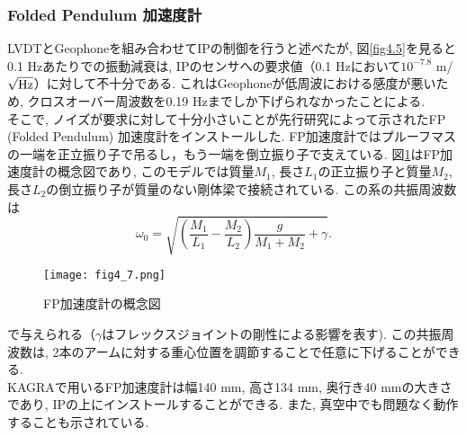 \subsubsection{Folded Pendulum 加速度計}
\vskip3mm
LVDTとGeophoneを組み合わせてIPの制御を行うと述べたが, 図\ref{fig4.5}を見ると0.1 Hzあたりでの振動減衰は, IPのセンサへの要求値（0.1 Hzにおいて$10^{-7.8}$ m/$\sqrt{{\rm Hz}}$）に対して不十分である. これはGeophoneが低周波における感度が悪いため, クロスオーバー周波数を0.19 Hzまでしか下げられなかったことによる. \\\quad そこで, ノイズが要求に対して十分小さいことが先行研究\cite{FP}によって示されたFP (Folded Pendulum) 加速度計をインストールした. FP加速度計ではプルーフマスの一端を正立振り子で吊るし，もう一端を倒立振り子で支えている. 図\ref{fig4.7}はFP加速度計の概念図であり, このモデルでは質量$M_1$, 長さ$L_1$の正立振り子と質量$M_2$, 長さ$L_2$の倒立振り子が質量のない剛体梁で接続されている. この系の共振周波数は
\begin{equation}
\omega_0=\sqrt{\left(\frac{M_1}{L_1}-\frac{M_2}{L_2}\right)\frac{g}{M_1+M_2}+\gamma}.
\end{equation}
\begin{figure}[H]
\begin{center}
\texttt{[image: fig4\_7.png]} 
\caption[FP加速度計]{FP加速度計の概念図}
\label{fig4.7}
\end{center}
\end{figure}
\noindent
で与えられる（$\gamma$はフレックスジョイントの剛性による影響を表す)\cite{39}. この共振周波数は, 2本のアームに対する重心位置を調節することで任意に下げることができる. \\
\quad KAGRAで用いるFP加速度計は幅140 mm, 高さ134 mm, 奥行き40 mmの大きさであり, IPの上にインストールすることができる. また, 真空中でも問題なく動作することも示されている\cite{FP}. 
